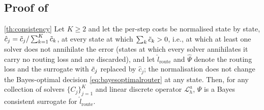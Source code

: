 \documentclass{article}
\newcommand{\edit}[1]{{\color{red}#1}}
\begin{document}
\subsection{Proof of } \label{sec:proofconsistency}

\begin{customtheorem}{\ref{th:consistency}}
    \edit{Let $K \ge 2$ and let the per-step costs be normalised state by state, $\hat c_j = \Tilde{c}_j / \sum_{k=1}^K \Tilde{c}_k$, at every state at which $\sum_k \Tilde{c}_k > 0$, i.e., at which at least one solver does not annihilate the error (states at which every solver annihilates it carry no routing loss and are discarded), and let $\hat l_{\text{route}}$ and $\hat\Psi$ denote the routing loss and the surrogate with $\Tilde{c}_j$ replaced by $\hat c_j$; the normalisation does not change the Bayes-optimal decision \eqref{eq:bayesoptimalrouter} at any state. Then, for any collection of solvers $\{C_j\}_{j= 1}^K$ and linear discrete operator $\mathcal{L}_h^a$, $\hat\Psi$ is a Bayes consistent surrogate for $\hat l_{\text{route}}$.}
\end{customtheorem}
\end{document}

